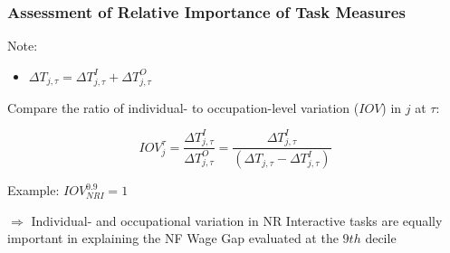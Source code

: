 \documentclass[10pt]{beamer}
\begin{document}
\begin{frame} 
	\frametitle{Assessment of Relative Importance of Task Measures}
	
	
	Note:
	
	\begin{itemize}
		\item $\Delta T_{j, \tau} = \Delta T_{j, \tau}^{I} + \Delta T_{j, \tau}^{O}$
	\end{itemize}
	
	\bigskip
	
	Compare the ratio of individual- to occupation-level variation ($IOV$) in $j$ at $\tau$: 
	
	\begin{equation} \label{iov}
	IOV_{j}^{\tau} = \frac{\Delta T_{j, \tau}^{I}}{\Delta T_{j, \tau}^{O}} =  \frac{\Delta T_{j, \tau}^{I}}{(\Delta T_{j, \tau} - \Delta T_{j, \tau}^{I})} 
	\end{equation}
	
	\bigskip
	
	Example: $IOV_{NRI}^{0.9} = 1$
	
	\medskip
	
	$\Longrightarrow$ Individual- and occupational variation in NR Interactive tasks  are equally important in explaining the NF Wage Gap evaluated at the $9th$ decile 
	
	
\end{frame}

\end{document}
